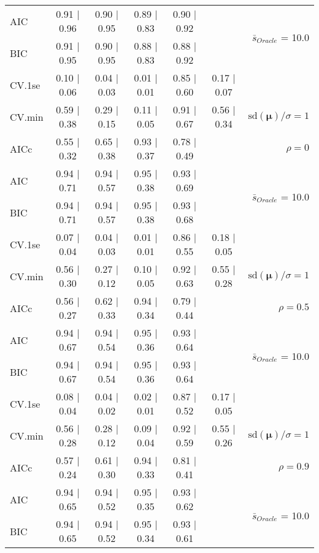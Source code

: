 \begin{table}
\begin{center}
\begin{tabular}{l*{5}{c}|r}
AIC & 0.91 $\mid$ 0.96 & 0.90 $\mid$ 0.95 & 0.89 $\mid$ 0.83 & 0.90 $\mid$ 0.92 & &  \multirow{2}{*}{$\bar{s}_{Oracle}$ = 10.0} \\
BIC & 0.91 $\mid$ 0.95 & 0.90 $\mid$ 0.95 & 0.88 $\mid$ 0.83 & 0.88 $\mid$ 0.92 & &  \\
 \hline 
CV.1se & 0.10 $\mid$ 0.06 & 0.04 $\mid$ 0.03 & 0.01 $\mid$ 0.01 & 0.85 $\mid$ 0.60 & 0.17 $\mid$ 0.07 & \\
CV.min & 0.59 $\mid$ 0.38 & 0.29 $\mid$ 0.15 & 0.11 $\mid$ 0.05 & 0.91 $\mid$ 0.67 & 0.56 $\mid$ 0.34 &  $\mathrm{sd}(\mathbf{\mu})/\sigma=1$ \\
AICc & 0.55 $\mid$ 0.32 & 0.65 $\mid$ 0.38 & 0.93 $\mid$ 0.37 & 0.78 $\mid$ 0.49 & & $\rho=0$ \\
AIC & 0.94 $\mid$ 0.71 & 0.94 $\mid$ 0.57 & 0.95 $\mid$ 0.38 & 0.93 $\mid$ 0.69 & &  \multirow{2}{*}{$\bar{s}_{Oracle}$ = 10.0} \\
BIC & 0.94 $\mid$ 0.71 & 0.94 $\mid$ 0.57 & 0.95 $\mid$ 0.38 & 0.93 $\mid$ 0.68 & &  \\
 \hline 
CV.1se & 0.07 $\mid$ 0.04 & 0.04 $\mid$ 0.03 & 0.01 $\mid$ 0.01 & 0.86 $\mid$ 0.55 & 0.18 $\mid$ 0.05 & \\
CV.min & 0.56 $\mid$ 0.30 & 0.27 $\mid$ 0.12 & 0.10 $\mid$ 0.05 & 0.92 $\mid$ 0.63 & 0.55 $\mid$ 0.28 &  $\mathrm{sd}(\mathbf{\mu})/\sigma=1$ \\
AICc & 0.56 $\mid$ 0.27 & 0.62 $\mid$ 0.33 & 0.94 $\mid$ 0.34 & 0.79 $\mid$ 0.44 & & $\rho=0.5$ \\
AIC & 0.94 $\mid$ 0.67 & 0.94 $\mid$ 0.54 & 0.95 $\mid$ 0.36 & 0.93 $\mid$ 0.64 & &  \multirow{2}{*}{$\bar{s}_{Oracle}$ = 10.0} \\
BIC & 0.94 $\mid$ 0.67 & 0.94 $\mid$ 0.54 & 0.95 $\mid$ 0.36 & 0.93 $\mid$ 0.64 & &  \\
 \hline 
CV.1se & 0.08 $\mid$ 0.04 & 0.04 $\mid$ 0.02 & 0.02 $\mid$ 0.01 & 0.87 $\mid$ 0.52 & 0.17 $\mid$ 0.05 & \\
CV.min & 0.56 $\mid$ 0.28 & 0.28 $\mid$ 0.12 & 0.09 $\mid$ 0.04 & 0.92 $\mid$ 0.59 & 0.55 $\mid$ 0.26 &  $\mathrm{sd}(\mathbf{\mu})/\sigma=1$ \\
AICc & 0.57 $\mid$ 0.24 & 0.61 $\mid$ 0.30 & 0.94 $\mid$ 0.33 & 0.81 $\mid$ 0.41 & & $\rho=0.9$ \\
AIC & 0.94 $\mid$ 0.65 & 0.94 $\mid$ 0.52 & 0.95 $\mid$ 0.35 & 0.93 $\mid$ 0.62 & &  \multirow{2}{*}{$\bar{s}_{Oracle}$ = 10.0} \\
BIC & 0.94 $\mid$ 0.65 & 0.94 $\mid$ 0.52 & 0.95 $\mid$ 0.34 & 0.93 $\mid$ 0.61 & &  \\

\end{tabular}
\end{center}
\end{table}
